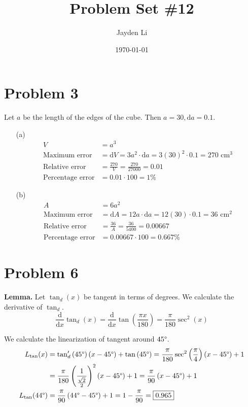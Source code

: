 \documentclass[preview, margin=0.6in]{standalone}
\title{\vspace*{-30pt}Problem Set \#12}
\author{Jayden Li}
\date{\today}
\newcommand*{\problem}[1]{\section*{Problem #1}}
\newcommand*{\deriv}[1][x]{\ensuremath{\dfrac{\mathrm{d}}{\mathrm{d}#1}}}
\begin{document}
\fontsize{12pt}{12pt}\selectfont
\setlength{\abovedisplayskip}{0pt}
\maketitle
\problem{3}
Let $a$ be the length of the edges of the cube. Then $a=30,\mathrm da=0.1$.
\begin{itemize}
	\item[(a)]
	\begin{align*}
	    V&=a^3 \\
		\text{Maximum error}&=\mathrm dV
		=3a^2\cdot\mathrm da
		=3(30)^2\cdot0.1
		=\boxed{270\text{ cm}^3} \\
		\text{Relative error}&=\frac{270}{V}=\frac{270}{27000}=\boxed{0.01} \\
		\text{Percentage error}&=0.01\cdot100=\boxed{1\%}
	\end{align*}
	
	\item[(b)]
	\begin{align*}
	    A&=6a^2 \\
		\text{Maximum error}&=\mathrm dA
		=12a\cdot\mathrm da
		=12(30)\cdot0.1
		=\boxed{36\text{ cm}^2} \\
		\text{Relative error}&=\frac{36}{A}=\frac{36}{5400}=\boxed{0.00667} \\
		\text{Percentage error}&=0.00667\cdot100=\boxed{0.667\%}
	\end{align*}
\end{itemize}

\problem{6}
\begin{mdframed}
	\textbf{Lemma.} Let $\tan_d(x)$ be tangent in terms of degrees. We calculate the derivative of $\tan_d$.
	\begin{equation*}
		\deriv[x]\tan_d(x)
		=\deriv[x]\tan\left(\frac{\pi x}{180}\right)
		=\frac{\pi}{180}\sec^2(x)
	\end{equation*}
\end{mdframed}

We calculate the linearization of tangent around $45\degree$.
\begin{align*}
	L_{\tan}(x)&=\tan_d'\left(45\degree\right)\left(x-45\degree\right)+\tan\left(45\degree\right)
	=\frac{\pi}{180}\sec^2\left(\frac{\pi}{4}\right)\left(x-45\degree\right)+1 \\
	&=\frac{\pi}{180}\left(\frac{1}{\frac{\sqrt{2}}{2}}\right)^{2}\left(x-45\degree\right)+1
	=\frac{\pi}{90}\left(x-45\degree\right)+1 \\
	L_{\tan}(44\degree)&=\frac{\pi}{90}\left(44\degree-45\degree\right)+1
	=1-\frac{\pi}{90}=\boxed{0.965}
\end{align*}
\end{document}
